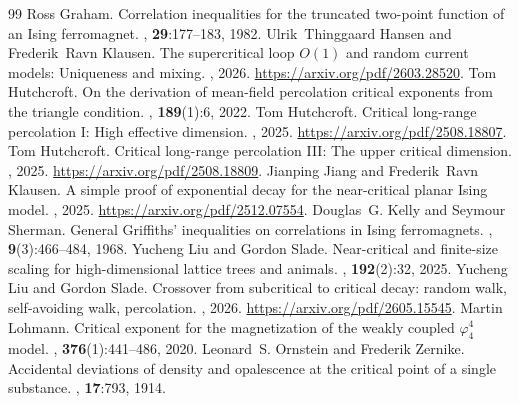 \documentclass[10pt,a4paper]{amsart}
\numberwithin{equation}{section}
\begin{document}
\begin{thebibliography}{99}
 Ross Graham. \newblock Correlation inequalities for the truncated two-point function of an {I}sing ferromagnet. , \textbf{29}:177--183, 1982.
 Ulrik~Thinggaard Hansen and Frederik~Ravn Klausen. \newblock The supercritical loop ${O}(1)$ and random current models: {U}niqueness and mixing. , 2026. \newblock \url{https://arxiv.org/pdf/2603.28520}.
 Tom Hutchcroft. \newblock On the derivation of mean-field percolation critical exponents from the triangle condition. , \textbf{189}(1):6, 2022.
 Tom Hutchcroft. \newblock Critical long-range percolation {I}: High effective dimension. , 2025. \newblock \url{https://arxiv.org/pdf/2508.18807}.
 Tom Hutchcroft. \newblock Critical long-range percolation {III}: The upper critical dimension. , 2025. \newblock \url{https://arxiv.org/pdf/2508.18809}.
 Jianping Jiang and Frederik~Ravn Klausen. \newblock A simple proof of exponential decay for the near-critical planar {I}sing model. , 2025. \newblock \url{https://arxiv.org/pdf/2512.07554}.
 Douglas~G. Kelly and Seymour Sherman. \newblock General {G}riffiths' inequalities on correlations in {I}sing ferromagnets. , \textbf{9}(3):466--484, 1968.
 Yucheng Liu and Gordon Slade. \newblock Near-critical and finite-size scaling for high-dimensional lattice trees and animals. , \textbf{192}(2):32, 2025.
 Yucheng Liu and Gordon Slade. \newblock Crossover from subcritical to critical decay: random walk, self-avoiding walk, percolation. , 2026. \newblock \url{https://arxiv.org/pdf/2605.15545}.
 Martin Lohmann. \newblock Critical exponent for the magnetization of the weakly coupled $\varphi^4_4$ model. , {\bf 376}(1):441--486, 2020.
 Leonard~S. Ornstein and Frederik Zernike. \newblock Accidental deviations of density and opalescence at the critical point of a single substance. , \textbf{17}:793, 1914.

\end{thebibliography}
\end{document}
